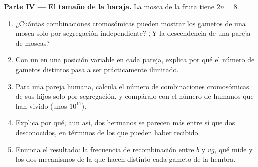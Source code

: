 \begin{problem}
\medskip
\noindent\textbf{Parte IV --- El tamaño de la baraja.}
La mosca de la fruta tiene $2n = 8$.
\begin{enumerate}[resume]
  \item ¿Cuántas combinaciones cromosómicas pueden mostrar los gametos
        de una mosca solo por segregación independiente? ¿Y la
        descendencia de una pareja de moscas?
  \item Con un  en una posición variable en cada
        pareja, explica por qué el número de gametos distintos pasa a
        ser prácticamente ilimitado.
  \item Para una pareja humana, calcula el número de combinaciones
        cromosómicas de sus hijos solo por segregación, y compáralo con
        el número de humanos que han vivido (unos $10^{11}$).
  \item Explica por qué, aun así, dos hermanos se parecen más entre sí
        que dos desconocidos, en términos de los  que pueden
        haber recibido.
  \item Enuncia el resultado: la frecuencia de recombinación entre $b$
        y $vg$, qué mide y los dos mecanismos de la  que hacen
        distinto cada gameto de la hembra.
\end{enumerate}
\end{problem}
